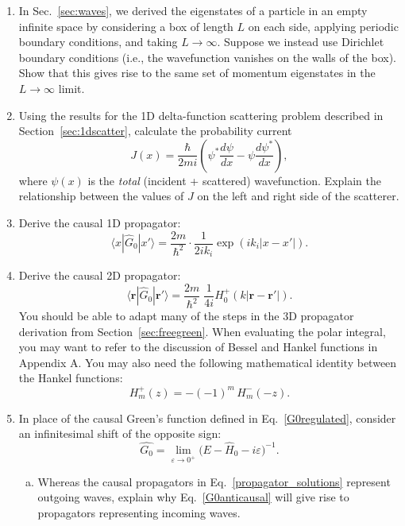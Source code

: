 \documentclass[prx,12pt]{revtex4-2}
\begin{document}
\begin{enumerate}
\item In Sec.~\ref{sec:waves}, we derived the eigenstates of a
  particle in an empty infinite space by considering a box of length
  $L$ on each side, applying periodic boundary conditions, and taking
  $L \rightarrow \infty$.  Suppose we instead use Dirichlet boundary
  conditions (i.e., the wavefunction vanishes on the walls of the
  box).  Show that this gives rise to the same set of momentum
  eigenstates in the $L \rightarrow \infty$ limit.

\item Using the results for the 1D delta-function scattering problem
  described in Section~\ref{sec:1dscatter}, calculate the probability
  current
  \begin{equation}
    J(x) = \frac{\hbar}{2mi}\left(\psi^*\frac{d\psi}{dx} - \psi\frac{d\psi^*}{dx}\right),
  \end{equation}
  where $\psi(x)$ is the \textit{total} (incident + scattered)
  wavefunction.  Explain the relationship between the values of $J$ on
  the left and right side of the scatterer.

\item \label{ex:1dpropagator}
  Derive the causal 1D propagator:
  \begin{equation}
    \langle x|\hat{G}_0|x'\rangle = \frac{2m}{\hbar^2} \cdot \frac{1}{2ik_i} \exp\left(ik_i|x-x'|\right).
  \end{equation}

\item \label{ex:2dpropagator}
  Derive the causal 2D propagator:
  \begin{equation}
    \langle\mathbf{r}|\hat{G}_0|\mathbf{r}'\rangle = \frac{2m}{\hbar^2}\;
    \frac{1}{4i} H^+_0(k|\mathbf{r}-\mathbf{r'}|).
  \end{equation}
  You should be able to adapt many of the steps in the 3D propagator
  derivation from Section~\ref{sec:freegreen}.  When evaluating the
  polar integral, you may want to refer to the discussion of Bessel
  and Hankel functions in Appendix A.  You may also need the following
  mathematical identity between the Hankel functions:
  \begin{equation}
    H_m^+(z) = - (-1)^m \, H_m^-(-z).
  \end{equation}
  
\item \label{ex:anticausal}
  In place of the causal Green's function defined in
  Eq.~\eqref{G0regulated}, consider an infinitesimal shift of the
  opposite sign:
  \begin{equation}
    \hat{G_0} = \lim_{\varepsilon\rightarrow 0^+} \big(E - \hat{H}_0 - i \varepsilon\big)^{-1}.
    \label{G0anticausal}
  \end{equation}
  \begin{enumerate}[(a)]
  \item 
  Whereas the causal propagators in Eq.~\eqref{propagator_solutions}
  represent outgoing waves, explain why Eq.~\eqref{G0anticausal} will
  give rise to propagators representing incoming waves.


\end{enumerate}
\end{enumerate}
\end{document}
